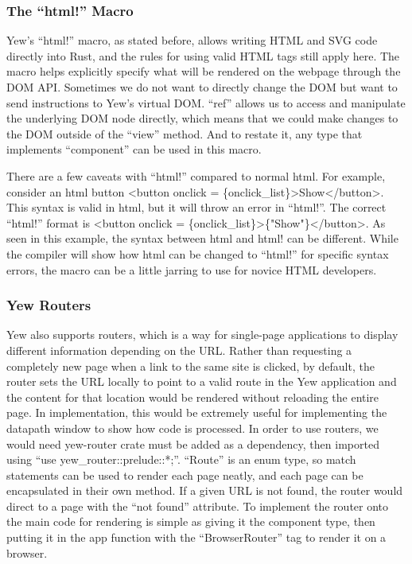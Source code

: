 \documentclass[
    paper=letter,
    parskip=half,
    fontsize=12pt,
    titlepage=firstiscover,
    toc=bibliography,
    numbers=endperiod
]{scrartcl}
\begin{document}
\subsubsection{The ``html!'' Macro}
\label{subsec:html-macro}

Yew's ``html!'' macro, as stated before, allows writing HTML and SVG
code directly into Rust, and the rules for using valid HTML tags still
apply here. The macro helps explicitly specify what will be rendered on
the webpage through the DOM API. Sometimes we do not want to directly
change the DOM but want to send instructions to Yew's virtual DOM.
``ref'' allows us to access and manipulate the underlying DOM node
directly, which means that we could make changes to the DOM outside of
the ``view'' method. And to restate it, any type that implements
``component'' can be used in this macro.

There are a few caveats with ``html!'' compared to normal html. For
example, consider an html button \textless button onclick =
\{onclick\_list\}\textgreater Show\textless/button\textgreater. This
syntax is valid in html, but it will throw an error in ``html!''. The
correct ``html!'' format is \textless button onclick =
\{onclick\_list\}\textgreater\{"Show"\}\textless/button\textgreater. As
seen in this example, the syntax between html and html! can be
different. While the compiler will show how html can be changed to
``html!'' for specific syntax errors, the macro can be a little jarring
to use for novice HTML developers.

\subsubsection{Yew Routers}

Yew also supports routers, which is a way for single-page applications
to display different information depending on the URL. Rather than
requesting a completely new page when a link to the same site is
clicked, by default, the router sets the URL locally to point to a valid
route in the Yew application and the content for that location would be
rendered without reloading the entire page. In implementation, this
would be extremely useful for implementing the datapath window to show
how code is processed. In order to use routers, we would need yew-router
crate must be added as a dependency, then imported using ``use
yew\_router::prelude::*;''. ``Route'' is an enum type, so match
statements can be used to render each page neatly, and each page can be
encapsulated in their own method. If a given URL is not found, the
router would direct to a page with the ``not found'' attribute. To
implement the router onto the main code for rendering is simple as
giving it the component type, then putting it in the app function with
the ``BrowserRouter'' tag to render it on a browser.
\end{document}
